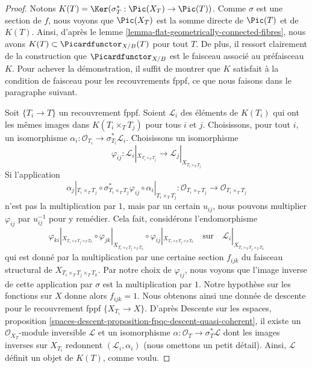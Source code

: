 \begin{proof}
Notons $K(T) = \Ker(\sigma_T^* : \Pic(X_T) \to \Pic(T))$.
Comme $\sigma$ est une section de $f$, nous voyons que $\Pic(X_T)$ est la somme
directe de $\Pic(T)$ et de $K(T)$.
Ainsi, d'après le lemme \ref{lemma-flat-geometrically-connected-fibres},
nous avons $K(T) \subset \Picardfunctor_{X/B}(T)$ pour tout $T$. De plus,
il ressort clairement de la construction que $\Picardfunctor_{X/B}$ est le
faisceau associé au préfaisceau $K$. Pour achever la démonstration, il suffit
de montrer que $K$ satisfait à la condition de faisceau pour les recouvrements
fppf, ce que nous faisons dans le paragraphe suivant.

\medskip\noindent
Soit $\{T_i \to T\}$ un recouvrement fppf. Soient $\mathcal{L}_i$ des éléments
de $K(T_i)$ qui ont les mêmes images dans $K(T_i \times_T T_j)$ pour tous
$i$ et $j$. Choisissons, pour tout $i$, un isomorphisme
$\alpha_i : \mathcal{O}_{T_i} \to \sigma_{T_i}^*\mathcal{L}_i$.
Choisissons un isomorphisme
$$
\varphi_{ij} :
\mathcal{L}_i|_{X_{T_i \times_T T_j}}
\longrightarrow
\mathcal{L}_j|_{X_{T_i \times_T T_j}}
$$
Si l'application
$$
\alpha_j|_{T_i \times_T T_j} \circ
\sigma_{T_i \times_T T_j}^*\varphi_{ij} \circ
\alpha_i|_{T_i \times_T T_j} :
\mathcal{O}_{T_i \times_T T_j} \to \mathcal{O}_{T_i \times_T T_j}
$$
n'est pas la multiplication par $1$, mais par un certain $u_{ij}$, nous pouvons
multiplier $\varphi_{ij}$ par $u_{ij}^{-1}$ pour y remédier. Cela fait,
considérons l'endomorphisme
$$
\varphi_{ki}|_{X_{T_i \times_T T_j \times_T T_k}} \circ
\varphi_{jk}|_{X_{T_i \times_T T_j \times_T T_k}} \circ
\varphi_{ij}|_{X_{T_i \times_T T_j \times_T T_k}}
\quad\text{sur}\quad
\mathcal{L}_i|_{X_{T_i \times_T T_j \times_T T_k}}
$$
qui est donné par la multiplication par une certaine section $f_{ijk}$ du
faisceau structural de $X_{T_i \times_T T_j \times_T T_k}$. Par notre choix
de $\varphi_{ij}$, nous voyons que l'image inverse de cette application par
$\sigma$ est la multiplication par $1$. Notre hypothèse sur les fonctions sur
$X$ donne alors $f_{ijk} = 1$. Nous obtenons ainsi une donnée de descente pour
le recouvrement fppf
$\{X_{T_i} \to X\}$. D'après Descente sur les espaces, proposition
\ref{spaces-descent-proposition-fpqc-descent-quasi-coherent}, il existe un
$\mathcal{O}_{X_T}$-module inversible $\mathcal{L}$ et un isomorphisme
$\alpha : \mathcal{O}_T \to \sigma_T^*\mathcal{L}$ dont les images inverses
sur $X_{T_i}$ redonnent $(\mathcal{L}_i, \alpha_i)$ (nous omettons un petit
détail). Ainsi, $\mathcal{L}$ définit un objet de $K(T)$, comme voulu.
\end{proof}

